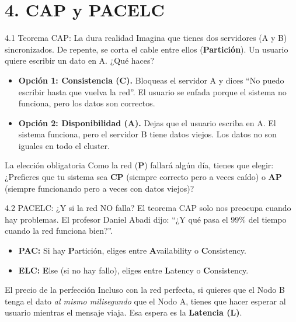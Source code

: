 \section{4. CAP y PACELC}

\begin{frame}{4.1 Teorema CAP: La dura realidad}
  Imagina que tienes dos servidores (A y B) sincronizados. De repente, se corta el cable entre ellos (\textbf{Partición}). Un usuario quiere escribir un dato en A. ¿Qué haces?
  
  \begin{itemize}
    \item \textbf{Opción 1: Consistencia (C).} Bloqueas el servidor A y dices ``No puedo escribir hasta que vuelva la red''. El usuario se enfada porque el sistema no funciona, pero los datos son correctos.
    \item \textbf{Opción 2: Disponibilidad (A).} Dejas que el usuario escriba en A. El sistema funciona, pero el servidor B tiene datos viejos. Los datos no son iguales en todo el cluster.
  \end{itemize}
  
  \begin{exampleblock}{La elección obligatoria}
    Como la red (\textbf{P}) fallará algún día, tienes que elegir: ¿Prefieres que tu sistema sea \textbf{CP} (siempre correcto pero a veces caído) o \textbf{AP} (siempre funcionando pero a veces con datos viejos)?
  \end{exampleblock}
\end{frame}

\begin{frame}{4.2 PACELC: ¿Y si la red NO falla?}
    El teorema CAP solo nos preocupa cuando hay problemas. El profesor Daniel Abadi dijo: ``¿Y qué pasa el 99\% del tiempo cuando la red funciona bien?''.
    
    \begin{itemize}
        \item \textbf{PAC:} Si hay \textbf{P}artición, eliges entre \textbf{A}vailability o \textbf{C}onsistency.
        \item \textbf{ELC:} \textbf{E}lse (si no hay fallo), eliges entre \textbf{L}atency o \textbf{C}onsistency.
    \end{itemize}
    
    \begin{alertblock}{El precio de la perfección}
        Incluso con la red perfecta, si quieres que el Nodo B tenga el dato \textit{al mismo milisegundo} que el Nodo A, tienes que hacer esperar al usuario mientras el mensaje viaja. Esa espera es la \textbf{Latencia (L)}.
    \end{alertblock}
\end{frame}

